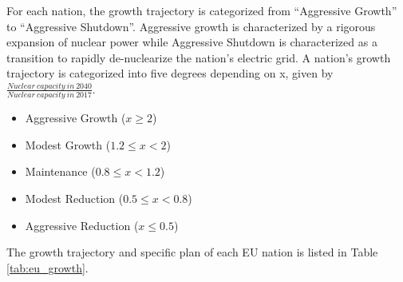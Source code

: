 For each nation, the growth trajectory is categorized from
``Aggressive Growth'' to ``Aggressive Shutdown''. Aggressive growth is
characterized by a rigorous expansion of nuclear power while 
Aggressive Shutdown is characterized as a transition to rapidly
de-nuclearize the nation's electric grid. A nation's growth trajectory is
categorized into five degrees depending on x, 
given by $\frac{Nuclear\ capacity\ in\ 2040}{Nuclear\ capacity\ in\ 2017}$.

\begin{itemize}
	\item Aggressive Growth ($x \geq 2$)
	\item Modest Growth ($1.2 \leq x < 2$)
	\item Maintenance ($0.8 \leq x < 1.2$)
	\item Modest Reduction ($0.5 \leq x< 0.8$)
	\item Aggressive Reduction ($x \leq 0.5$)
\end{itemize}

The growth trajectory and specific plan of each \gls{EU} nation 
is listed in Table \ref{tab:eu_growth}.

